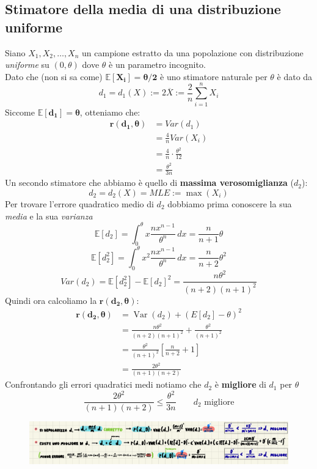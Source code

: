 \documentclass[]{article}
\newcommand{\ev}{\mathbb{E}[X]}
\renewcommand{\ev}[1]{\mathbb{E}\left[#1\right]}
\begin{document}
    \subsection{Stimatore della media di una distribuzione uniforme}
    Siano $X_1, X_2, \ldots, X_n$ un campione estratto da una popolazione con distribuzione \textit{uniforme} su $(0, \theta)$ dove $\theta$ è un parametro incognito. \\
    Dato che (non si sa come) $\boldsymbol{\ev{X_i} = \theta / 2}$ è uno stimatore naturale per $\theta$ è dato da
    \[ d_1 = d_1 (X) := 2 \overline{X} := \frac{2}{n} \displaystyle\sum_{i=1}^{n} X_i \]
    Siccome $\boldsymbol{\ev{d_1} = \theta}$, otteniamo che:
    \begin{equation*}
        \begin{split}
            \boldsymbol{r(d_1, \theta)} &= Var(d_1) \\
            &= \frac{4}{n} Var(X_i) \\
            &= \frac{4}{n} \cdot \frac{\theta^2}{12} \\
            &= \frac{\theta^2}{3n}
        \end{split}
    \end{equation*}
    Un secondo stimatore che abbiamo è quello di \textbf{massima verosomiglianza} ($d_2$):
    \[ d_2 = d_2(X) = MLE := \max(X_i) \]
    Per trovare l'errore quadratico medio di $d_2$ dobbiamo prima conoscere la sua \textit{media} e la sua \textit{varianza}
    \[ \ev{d_2} = \int_{0}^{\theta} x \frac{nx^{n-1}}{\theta^n} \, dx = \frac{n}{n + 1} \theta \]
    \[ \ev{d^2_2} = \int_{0}^{\theta} x^2 \frac{nx^{n-1}}{\theta^n} \, dx = \frac{n}{n+2} \theta^2 \]
    \[ Var(d_2) = \ev{d^2_2} - \ev{d_2}^2 = \frac{n \theta^2}{(n+2) (n+1)^2} \]
    Quindi ora calcoliamo la $\boldsymbol{r(d_2, \theta)}$:
    \begin{equation}
        \begin{aligned}
        \boldsymbol{r\left(d_2, \theta\right)} & =\operatorname{Var}\left(d_2\right)+\left(E\left[d_2\right]-\theta\right)^2 \\
        & =\frac{n \theta^2}{(n+2)(n+1)^2}+\frac{\theta^2}{(n+1)^2} \\
        & =\frac{\theta^2}{(n+1)^2}\left[\frac{n}{n+2}+1\right] \\
        & =\frac{2 \theta^2}{(n+1)(n+2)}
        \end{aligned}
    \end{equation}
    Confrontando gli errori quadratici medi notiamo che $d_2$ è \textbf{migliore} di $d_1$ per $\theta$
    \[ \frac{2 \theta^2}{(n+1)(n+2)} \leq \frac{\theta^2}{3n} \qquad \text{$d_2$ migliore} \]
    \begin{figure}[H]
        \includegraphics[width=\textwidth]{images/boh_5.png}
    \end{figure}
\end{document}
